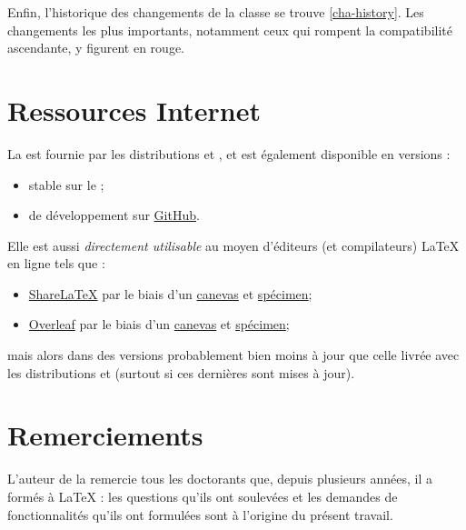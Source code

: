 Enfin, l'historique des changements de la classe se trouve \vref{cha-history}.
Les changements les plus importants, notamment ceux qui rompent la compatibilité
ascendante, y figurent en rouge.

\section{Ressources Internet}
\label{sec-ressources-internet}
%

La \yatCl{} est fournie par les distributions \texlive et \miktex, et est également disponible en versions :
\begin{itemize}
\item stable sur le \href{http://ctan.org/pkg/yathesis}{} ;
\item de développement sur \href{https://github.com/dbitouze/yathesis}{GitHub}.
\end{itemize}

Elle est aussi \emph{directement utilisable} au moyen d'éditeurs (et compilateurs)
\LaTeX{} en ligne%
%
%
%
%
tels que :
\begin{itemize}
\item \href{https://fr.sharelatex.com/}{ShareLaTeX} par le biais d'un
  \href{https://frama.link/sharelatex-yathesis-template}{canevas}
  et
  \href{https://frama.link/sharelatex-yathesis-specimen}{spécimen}\detailsspecimencanevas ;
\item \href{https://www.overleaf.com/}{Overleaf} par le biais d'un
  \href{https://frama.link/overleaf-yathesis-template}{canevas}
  et
  \href{https://frama.link/overleaf-yathesis-sample}{spécimen}\detailsspecimencanevas ;
\end{itemize}
mais alors dans des versions probablement bien moins à jour que celle livrée
avec les distributions \texlive et \miktex (surtout si ces dernières sont mises
à jour).

\section{Remerciements}
\label{sec-remerciements}

L'auteur de la \yatCl{} remercie tous les doctorants que, depuis plusieurs
années, il a formés à \LaTeX{} : les questions qu'ils ont soulevées et les
demandes de fonctionnalités qu'ils ont formulées sont à l'origine du présent
travail.

